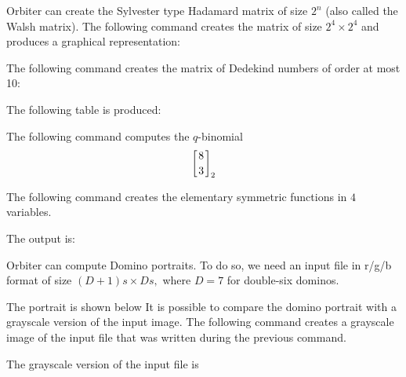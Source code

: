 


\bigskip

Orbiter can create the Sylvester type Hadamard matrix 
of size $2^n$ (also called the Walsh matrix). 
The following command creates the matrix of size 
$2^4 \times 2^4$ and produces a graphical representation:




\bigskip

The following command creates the matrix of Dedekind numbers of order at most 10:


The following table is produced:



\bigskip

The following command computes the $q$-binomial
$$
\left[
{8 \atop 3}
\right]_2
$$



\bigskip



The following command creates the elementary symmetric functions in $4$ variables.


The output is:

\bigskip

Orbiter can compute Domino portraits. 
To do so, we need an input file in r/g/b format 
of size $(D+1)s \times Ds,$ where $D=7$ for double-six dominos.


The portrait is shown 
below
It is possible to compare the domino portrait 
with a grayscale version of the input image.
The following command creates a grayscale image of the input file 
that was written during the previous command.


The grayscale version of the input file is 






\bigskip


